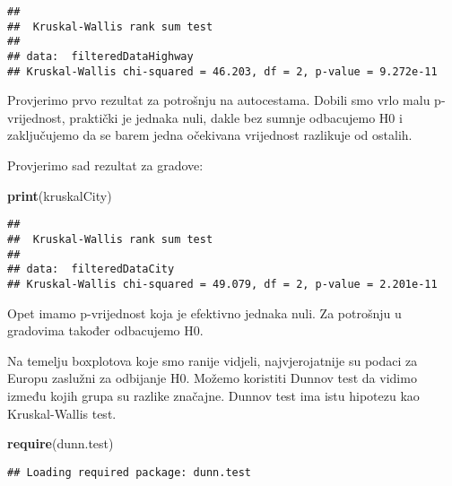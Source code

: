 \documentclass[
]{article}
\newenvironment{Shaded}{\begin{snugshade}}{\end{snugshade}}
\newcommand{\AttributeTok}[1]{\textcolor[rgb]{0.13,0.29,0.53}{#1}}
\newcommand{\FloatTok}[1]{\textcolor[rgb]{0.00,0.00,0.81}{#1}}
\newcommand{\FunctionTok}[1]{\textcolor[rgb]{0.13,0.29,0.53}{\textbf{#1}}}
\newcommand{\NormalTok}[1]{#1}
\newcommand{\OtherTok}[1]{\textcolor[rgb]{0.56,0.35,0.01}{#1}}
\newcommand{\SpecialCharTok}[1]{\textcolor[rgb]{0.81,0.36,0.00}{\textbf{#1}}}
\newcommand{\StringTok}[1]{\textcolor[rgb]{0.31,0.60,0.02}{#1}}
\begin{document}
\begin{verbatim}
## 
##  Kruskal-Wallis rank sum test
## 
## data:  filteredDataHighway
## Kruskal-Wallis chi-squared = 46.203, df = 2, p-value = 9.272e-11
\end{verbatim}

Provjerimo prvo rezultat za potrošnju na autocestama. Dobili smo vrlo
malu p-vrijednost, praktički je jednaka nuli, dakle bez sumnje
odbacujemo H0 i zaključujemo da se barem jedna očekivana vrijednost
razlikuje od ostalih.

Provjerimo sad rezultat za gradove:

\begin{Shaded}
\begin{Highlighting}[]
\FunctionTok{print}\NormalTok{(kruskalCity)}
\end{Highlighting}
\end{Shaded}

\begin{verbatim}
## 
##  Kruskal-Wallis rank sum test
## 
## data:  filteredDataCity
## Kruskal-Wallis chi-squared = 49.079, df = 2, p-value = 2.201e-11
\end{verbatim}

Opet imamo p-vrijednost koja je efektivno jednaka nuli. Za potrošnju u
gradovima također odbacujemo H0.

Na temelju boxplotova koje smo ranije vidjeli, najvjerojatnije su podaci
za Europu zaslužni za odbijanje H0. Možemo koristiti Dunnov test da
vidimo između kojih grupa su razlike značajne. Dunnov test ima istu
hipotezu kao Kruskal-Wallis test.

\begin{Shaded}
\begin{Highlighting}[]
\FunctionTok{require}\NormalTok{(dunn.test)}
\end{Highlighting}
\end{Shaded}

\begin{verbatim}
## Loading required package: dunn.test
\end{verbatim}

\begin{Shaded}
\end{Shaded}
\end{document}
